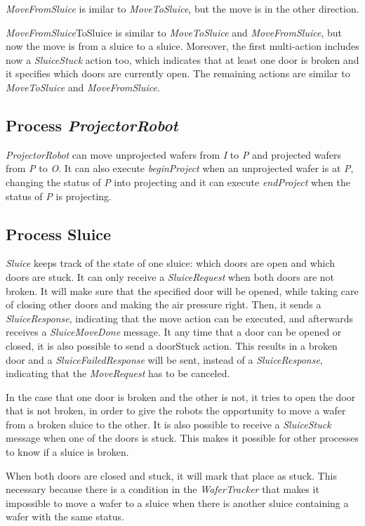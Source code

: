  \emph{MoveFromSluice} is imilar to \emph{MoveToSluice}, but the move is in the other direction.


 \emph{MoveFromSluice}ToSluice is similar to \emph{MoveToSluice} and \emph{MoveFromSluice}, but now the move is from a
 sluice to a sluice. Moreover, the first multi-action includes now a
 \emph{SluiceStuck} action too, which indicates that at least one door is broken and
 it specifies which doors are currently open. The remaining actions are
 similar to \emph{MoveToSluice} and \emph{MoveFromSluice}.

 
\subsection{Process \emph{ProjectorRobot}}


 \emph{ProjectorRobot} can move unprojected wafers from \emph{I} to \emph{P} and projected wafers
 from \emph{P} to \emph{O}. It can also execute \emph{beginProject} when an unprojected wafer is
 at \emph{P}, changing the status of \emph{P} into projecting and it can execute \emph{endProject}
 when the status of \emph{P} is projecting.

\subsection{Process Sluice}


 \emph{Sluice} keeps track of the state of one sluice: which doors are open and
 which doors are stuck. It can only receive a \emph{SluiceRequest} when both doors
 are not broken. It will make sure that the specified door will be opened,
 while taking care of closing other doors and making the air pressure right.
 Then, it sends a \emph{SluiceResponse}, indicating that the move action can be
 executed, and afterwards receives a \emph{SluiceMoveDone} message. It any time that
 a door can be opened or closed, it is also possible to send a doorStuck
 action. This results in a broken door and a \emph{SluiceFailedResponse} will be
 sent, instead of a \emph{SluiceResponse}, indicating that the \emph{MoveRequest} has to
 be canceled.
 
 In the case that one door is broken and the other is not, it tries to open
 the door that is not broken, in order to give the robots the opportunity
 to move a wafer from a broken sluice to the other.
 It is also possible to receive a \emph{SluiceStuck} message when one of the doors
 is stuck. This makes it possible for other processes to know if a sluice is
 broken.
 
 When both doors are closed and stuck, it will mark that place as stuck. This
 necessary because there is a condition in the \emph{WaferTracker} that makes it
 impossible to move a wafer to a sluice when there is another sluice
 containing a wafer with the same status.

\cbend